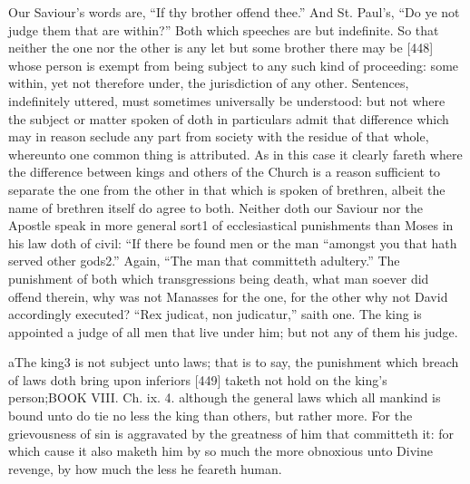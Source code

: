 Our Saviour’s words are, “If thy brother offend thee.” And St. Paul’s, “Do ye not judge them that are within?” Both which speeches are but indefinite. So that neither the one nor the other is any let but some brother there may be [448] whose person is exempt from being subject to any such kind of proceeding: some within, yet not therefore under, the jurisdiction of any other. Sentences, indefinitely uttered, must sometimes universally be understood: but not where the subject or matter spoken of doth in particulars admit that difference which may in reason seclude any part from society with the residue of that whole, whereunto one common thing is attributed. As in this case it clearly fareth where the difference between kings and others of the Church is a reason sufficient to separate the one from the other in that which is spoken of brethren, albeit the name of brethren itself do agree to both. Neither doth our Saviour nor the Apostle speak in more general sort1 of ecclesiastical punishments than Moses in his law doth of civil: “If there be found men or the man “amongst you that hath served other gods2.” Again, “The man that committeth adultery.” The punishment of both which transgressions being death, what man soever did offend therein, why was not Manasses for the one, for the other why not David accordingly executed? “Rex judicat, non judicatur,” saith one. The king is appointed a judge of all men that live under him; but not any of them his judge.

aThe king3 is not subject unto laws; that is to say, the punishment which breach of laws doth bring upon inferiors [449] taketh not hold on the king’s person;BOOK VIII. Ch. ix. 4. although the general laws which all mankind is bound unto do tie no less the king than others, but rather more. For the grievousness of sin is aggravated by the greatness of him that committeth it: for which cause it also maketh him by so much the more obnoxious unto Divine revenge, by how much the less he feareth human.

